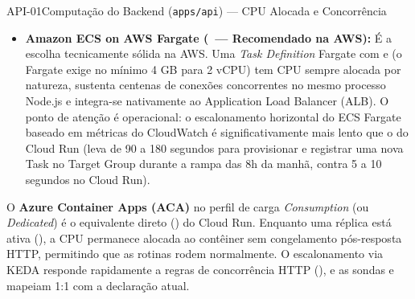 \begin{pecaarq}{API-01}{Computação do Backend (\texttt{apps/api}) --- CPU Alocada e Concorrência}{\sgcp~\nativo\enspace\saws~\equivalente\enspace\sazure~\nativo}
\begin{campos}
\begin{itemize}
    \item \textbf{Amazon ECS on AWS Fargate (\equivalente\ --- Recomendado na AWS):} É a escolha tecnicamente sólida na AWS. Uma \emph{Task Definition} Fargate com  e  (o Fargate exige no mínimo 4 GB para 2 vCPU) tem CPU sempre alocada por natureza, sustenta centenas de conexões concorrentes no mesmo processo Node.js e integra-se nativamente ao Application Load Balancer (ALB). O ponto de atenção é operacional: o escalonamento horizontal do ECS Fargate baseado em métricas do CloudWatch é significativamente mais lento que o do Cloud Run (leva de 90 a 180 segundos para provisionar e registrar uma nova Task no Target Group durante a rampa das 8h da manhã, contra 5 a 10 segundos no Cloud Run).
  \end{itemize}
  \item[Equivalente Azure] O \textbf{Azure Container Apps (ACA)} no perfil de carga \emph{Consumption} (ou \emph{Dedicated}) é o equivalente direto (\nativo) do Cloud Run. Enquanto uma réplica está ativa (), a CPU permanece alocada ao contêiner sem congelamento pós-resposta HTTP, permitindo que as rotinas  rodem normalmente. O escalonamento via KEDA responde rapidamente a regras de concorrência HTTP (), e as sondas  e  mapeiam 1:1 com a declaração atual.
\end{campos}
\end{pecaarq}

